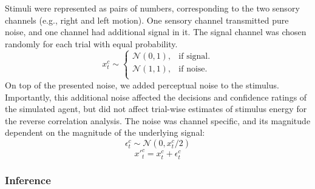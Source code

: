 \documentclass[12pt,twoside]{reedthesis}
\begin{document}
Stimuli were represented as pairs of numbers, corresponding to the two sensory channels (e.g., right and left motion). One sensory channel transmitted pure noise, and one channel had additional signal in it. The signal channel was chosen randomly for each trial with equal probability.
\begin{equation}
  x^c_t \sim \begin{cases}
    \mathcal{N}(0,1), & \text{if signal}.\\
    \mathcal{N}(1,1), & \text{if noise}.\\
  \end{cases}
\end{equation}
On top of the presented noise, we added perceptual noise to the stimulus. Importantly, this additional noise affected the decisions and confidence ratings of the simulated agent, but did not affect trial-wise estimates of stimulus energy for the reverse correlation analysis. The noise was channel specific, and its magnitude dependent on the magnitude of the underlying signal:
\begin{equation}
  \epsilon^c_t \sim \mathcal{N}(0,x^c_t/2)
\end{equation}
\begin{equation}
 x'^c_t= x^c_t+\epsilon^c_t
\end{equation}
\hypertarget{inference}{%
\subsubsection*{Inference}\label{inference}}
\end{document}

